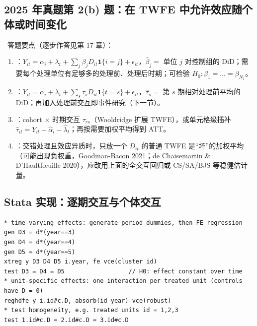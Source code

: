 \subsection{2025 年真题第 2(b) 题：在 TWFE 中允许效应随个体或时间变化}

\begin{keypt}
\tagexam\ 答题要点（逐步作答见第 17 章）：
\begin{enumerate}
  \item {}：$Y_{it}=\alpha_i+\lambda_t+\sum_j\beta_jD_{it}\mathbf{1}\{i=j\}+\epsilon_{it}$，$\hat\beta_j=$ 单位 $j$ 对控制组的 DiD；需要每个处理单位有足够多的处理前、处理后时期；可检验 $H_0:\beta_1=\dots=\beta_{N_1}$。
  \item {}：$Y_{it}=\alpha_i+\lambda_t+\sum_s\tau_sD_{it}\mathbf{1}\{t=s\}+\epsilon_{it}$，$\hat\tau_s=$ 第 $s$ 期相对处理前平均的 DiD；再加入处理前交互即事件研究（下一节）。
  \item {}：cohort $\times$ 时期交互 $\tau_{rs}$（Wooldridge 扩展 TWFE），或单元格级插补 $\hat\tau_{it}=Y_{it}-\hat\alpha_i-\hat\lambda_t$；再按需要加权平均得到 ATT。
  \item {}：交错处理且效应异质时，只放一个 $D_{it}$ 的普通 TWFE 是“坏”的加权平均（可能出现负权重，Goodman-Bacon 2021；de Chaisemartin \& D'Haultf{\oe}uille 2020），应改用上面的全交互回归或 CS/SA/BJS 等稳健估计量。
\end{enumerate}
\end{keypt}

\subsection{Stata 实现：逐期交互与个体交互}

\begin{lstlisting}
* time-varying effects: generate period dummies, then FE regression
gen D3 = d*(year==3)
gen D4 = d*(year==4)
gen D5 = d*(year==5)
xtreg y D3 D4 D5 i.year, fe vce(cluster id)
test D3 = D4 = D5                  // H0: effect constant over time
* unit-specific effects: one interaction per treated unit (controls have D = 0)
reghdfe y i.id#c.D, absorb(id year) vce(robust)
* test homogeneity, e.g. treated units id = 1,2,3
test 1.id#c.D = 2.id#c.D = 3.id#c.D
\end{lstlisting}

